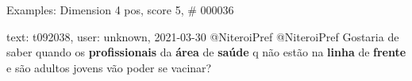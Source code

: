 \begin{frame}{Examples: Dimension 4 pos, score 5, \# 000036}
\footnotesize
\begin{exampleblock}{text: t092038, user: unknown, 2021-03-30}
@NiteroiPref @NiteroiPref Gostaria de saber quando os \textbf{profissionais} da 
\textbf{área} de \textbf{saúde} q não estão na \textbf{linha} de 
\textbf{frente} e são adultos jovens vão poder se vacinar? 
\end{exampleblock}
\end{frame}
